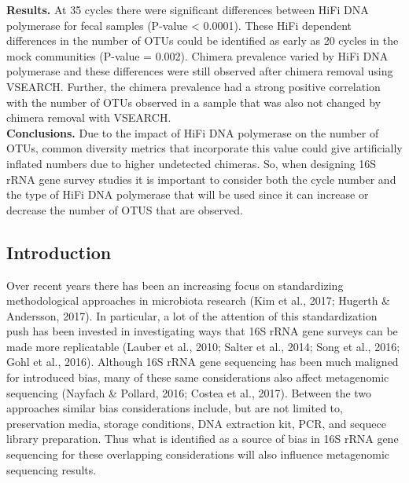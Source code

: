 \documentclass[12pt,]{article}
\begin{document}
\textbf{Results.} At 35 cycles there were significant differences
between HiFi DNA polymerase for fecal samples (P-value \textless{}
0.0001). These HiFi dependent differences in the number of OTUs could be
identified as early as 20 cycles in the mock communities (P-value =
0.002). Chimera prevalence varied by HiFi DNA polymerase and these
differences were still observed after chimera removal using VSEARCH.
Further, the chimera prevalence had a strong positive correlation with
the number of OTUs observed in a sample that was also not changed by
chimera removal with VSEARCH.\\
\textbf{Conclusions.} Due to the impact of HiFi DNA polymerase on the
number of OTUs, common diversity metrics that incorporate this value
could give artificially inflated numbers due to higher undetected
chimeras. So, when designing 16S rRNA gene survey studies it is
important to consider both the cycle number and the type of HiFi DNA
polymerase that will be used since it can increase or decrease the
number of OTUS that are observed.

\newpage

\subsection{Introduction}\label{introduction}

Over recent years there has been an increasing focus on standardizing
methodological approaches in microbiota research (Kim et al., 2017;
Hugerth \& Andersson, 2017). In particular, a lot of the attention of
this standardization push has been invested in investigating ways that
16S rRNA gene surveys can be made more replicatable (Lauber et al.,
2010; Salter et al., 2014; Song et al., 2016; Gohl et al., 2016).
Although 16S rRNA gene sequencing has been much maligned for introduced
bias, many of these same considerations also affect metagenomic
sequencing (Nayfach \& Pollard, 2016; Costea et al., 2017). Between the
two approaches similar bias considerations include, but are not limited
to, preservation media, storage conditions, DNA extraction kit, PCR, and
sequece library preparation. Thus what is identified as a source of bias
in 16S rRNA gene sequencing for these overlapping considerations will
also influence metagenomic sequencing results.
\end{document}
